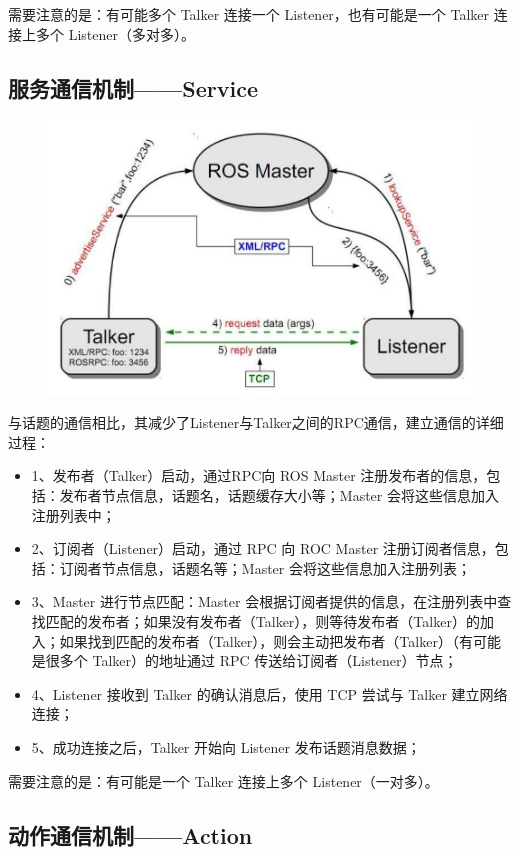 \documentclass[9pt, oneside]{book}
\begin{document}
需要注意的是：有可能多个 Talker 连接一个 Listener，也有可能是一个 Talker 连接上多个 Listener（多对多）。

\subsection{服务通信机制——Service}

\begin{figure}[H]
    \centering
    \includegraphics[width=0.7\linewidth]{image/服务通信机制.jpg}
\end{figure}

与话题的通信相比，其减少了Listener与Talker之间的RPC通信，建立通信的详细过程：

\begin{itemize}
    \item 1、发布者（Talker）启动，通过RPC向 ROS Master 注册发布者的信息，包括：发布者节点信息，话题名，话题缓存大小等；Master 会将这些信息加入注册列表中；
    \item 2、订阅者（Listener）启动，通过 RPC 向 ROC Master 注册订阅者信息，包括：订阅者节点信息，话题名等；Master 会将这些信息加入注册列表；
    \item 3、Master 进行节点匹配：Master 会根据订阅者提供的信息，在注册列表中查找匹配的发布者；如果没有发布者（Talker），则等待发布者（Talker）的加入；如果找到匹配的发布者（Talker），则会主动把发布者（Talker）（有可能是很多个 Talker）的地址通过 RPC 传送给订阅者（Listener）节点；
    \item 4、Listener 接收到 Talker 的确认消息后，使用 TCP 尝试与 Talker 建立网络连接；
    \item 5、成功连接之后，Talker 开始向 Listener 发布话题消息数据；
\end{itemize}

需要注意的是：有可能是一个 Talker 连接上多个 Listener（一对多）。

\subsection{动作通信机制——Action}
\end{document}
